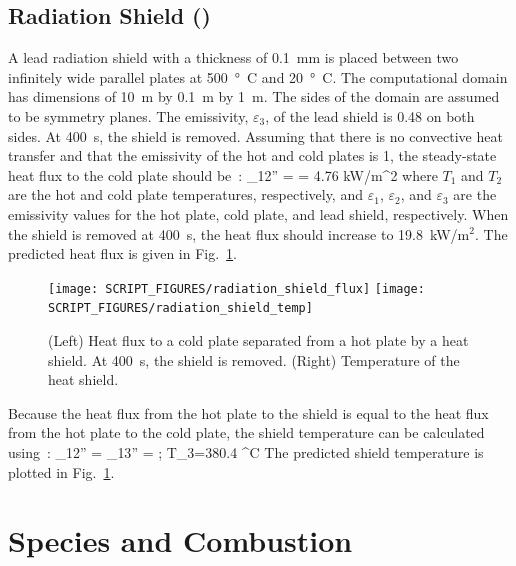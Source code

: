\documentclass[11pt]{book}
\begin{document}
\section{Radiation Shield (\texorpdfstring{}{radiation\_shield}) }
\label{radiation_shield}

A lead radiation shield with a thickness of 0.1~mm is placed between two infinitely wide parallel plates at 500~\si{\degree C} and 20~\si{\degree C}.  The computational domain has dimensions of 10~m by 0.1~m by 1~m. The sides of the domain are assumed to be symmetry planes.  The emissivity, $\varepsilon_{3}$, of the lead shield is 0.48 on both sides.  At 400~s, the shield is removed.  Assuming that there is no convective heat transfer and that the emissivity of the hot and cold plates is 1, the steady-state heat flux to the cold plate should be~\cite{Incropera:1}:
\be
   \dq_{12}'' =  = 4.76 \; \hbox{kW/m}^2
\ee
where $T_{1}$ and $T_{2}$ are the hot and cold plate temperatures, respectively, and $\varepsilon_1$, $\varepsilon_2$, and $\varepsilon_3$ are the emissivity values for the hot plate, cold plate, and lead shield, respectively. When the shield is removed at 400~s, the heat flux should increase to 19.8~kW/m$^2$.  The predicted heat flux is given in Fig.~\ref{radiation_shield_plot}.
\begin{figure}[ht]
\texttt{[image: SCRIPT\_FIGURES/radiation\_shield\_flux]}
\texttt{[image: SCRIPT\_FIGURES/radiation\_shield\_temp]}
\caption[The  test case]{(Left) Heat flux to a cold plate separated from a hot plate by a heat shield. At 400~s, the shield is removed. (Right) Temperature of the heat shield.}
\label{radiation_shield_plot}
\end{figure}
Because the heat flux from the hot plate to the shield is equal to the heat flux from the hot plate to the cold plate, the shield temperature can be calculated using~\cite{Incropera:1}:
\be
   \dq_{12}'' = \dq_{13}'' =  \quad ; \quad T_3=380.4 \; ^\circ\hbox{C}
\ee
The predicted shield temperature is plotted in Fig.~\ref{radiation_shield_plot}.




\chapter{Species and Combustion}
\end{document}
